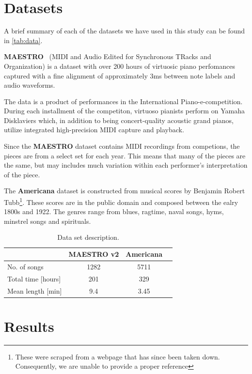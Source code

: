 \documentclass{IEEEtran}
\begin{document}
\section{Datasets}

A brief summary of each of the datasets we have used in this study can be
found in \autoref{tab:data}.

\textbf{MAESTRO}~\cite{maestrodataset} (MIDI and Audio Edited for Synchronous
TRacks and Organization) is a dataset with over 200 hours of virtuosic piano
perfomances captured with a fine alignment of approximately 3ms between note
labels and audio waveforms.

The data is a product of performances in the International
Piano-e-competition. During each installment of the competiton, virtuoso
pianists perform on Yamaha Disklaviers which, in addition to being
concert-quality acoustic grand pianos, utilize integrated high-precision MIDI
capture and playback.

Since the \textbf{MAESTRO} dataset contains MIDI recordings from competions,
the pieces are from a select set for each year. This means that many of the
pieces are the same, but may includes much variation within each performer's
interpretation of the piece.

The \textbf{Americana} dataset is constructed from musical scores by Benjamin
Robert Tubb\footnote{These were scraped from a webpage that has since been
taken down. Consequently, we are unable to provide a proper reference}. These
scores are in the public domain and composed between the ealry 1800s and
1922. The genres range from blues, ragtime, naval songs, hyms, minstrel songs
and spirituals.

\begin{table}
    \begin{center}
    \caption{
        Data set description.
        \label{tab:data}
    }
    \begin{tabular}{l c c c} \hline
            & MAESTRO v2 & Americana \\ \hline\hline
        No. of songs & 1282 & 5711 \\ \hline
        Total time [hours] & 201 & 329 \\ \hline
        Mean length [min] & 9.4 & 3.45 \\ \hline
    \end{tabular}
    \end{center}
\end{table}


\section{Results}
\end{document}
